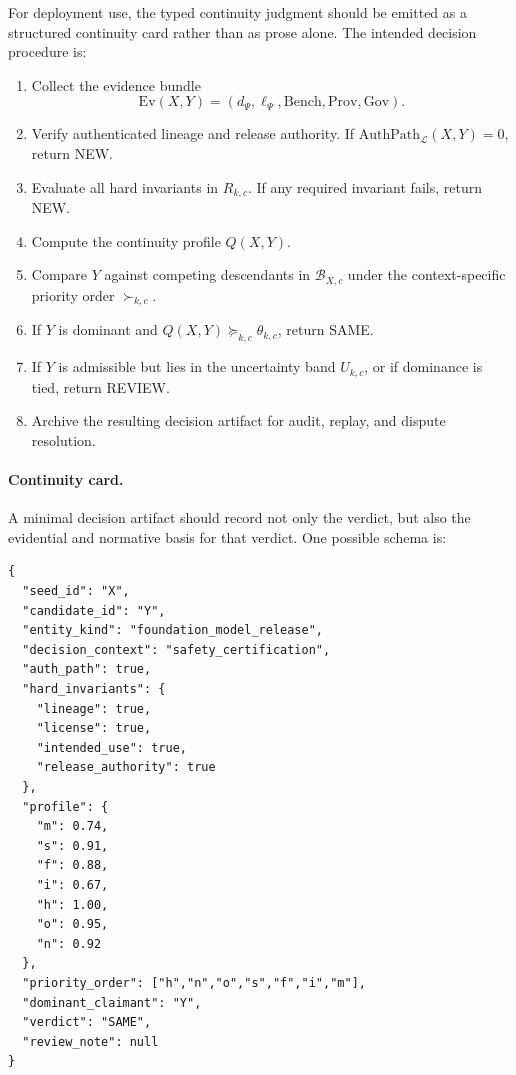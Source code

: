 \documentclass[11pt,a4paper]{article}
\begin{document}
For deployment use, the typed continuity judgment should be emitted as a structured continuity card rather than as prose alone. The intended decision procedure is:

\begin{enumerate}
    \item Collect the evidence bundle
    \[
    \mathrm{Ev}(X,Y) = (d_{\Psi}, \ell_{\Psi}, \mathrm{Bench}, \mathrm{Prov}, \mathrm{Gov}).
    \]
    \item Verify authenticated lineage and release authority. If \(\mathrm{AuthPath}_{\mathcal{L}}(X,Y)=0\), return \textsc{NEW}.
    \item Evaluate all hard invariants in \(R_{k,c}\). If any required invariant fails, return \textsc{NEW}.
    \item Compute the continuity profile \(Q(X,Y)\).
    \item Compare \(Y\) against competing descendants in \(\mathcal{B}_{X,c}\) under the context-specific priority order \(\succ_{k,c}\).
    \item If \(Y\) is dominant and \(Q(X,Y) \succeq_{k,c} \theta_{k,c}\), return \textsc{SAME}.
    \item If \(Y\) is admissible but lies in the uncertainty band \(U_{k,c}\), or if dominance is tied, return \textsc{REVIEW}.
    \item Archive the resulting decision artifact for audit, replay, and dispute resolution.
\end{enumerate}

\paragraph{Continuity card.}
A minimal decision artifact should record not only the verdict, but also the evidential and normative basis for that verdict. One possible schema is:

\begin{verbatim}
{
  "seed_id": "X",
  "candidate_id": "Y",
  "entity_kind": "foundation_model_release",
  "decision_context": "safety_certification",
  "auth_path": true,
  "hard_invariants": {
    "lineage": true,
    "license": true,
    "intended_use": true,
    "release_authority": true
  },
  "profile": {
    "m": 0.74,
    "s": 0.91,
    "f": 0.88,
    "i": 0.67,
    "h": 1.00,
    "o": 0.95,
    "n": 0.92
  },
  "priority_order": ["h","n","o","s","f","i","m"],
  "dominant_claimant": "Y",
  "verdict": "SAME",
  "review_note": null
}
\end{verbatim}
\end{document}
